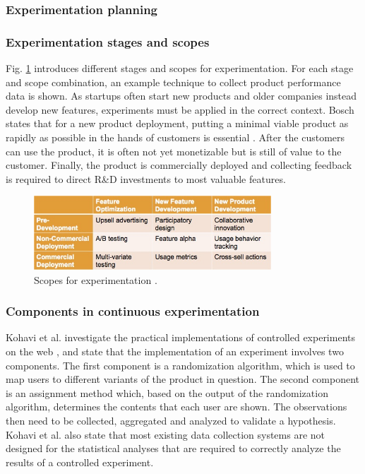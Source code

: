 \documentclass[english]{tktltiki2}
\theoremstyle{definition}
\theoremstyle{remark}
\begin{document}
\subsubsection{Experimentation planning}

\subsubsection{Experimentation stages and scopes}
Fig. \ref{fig4} introduces different stages and scopes for experimentation. For each stage and scope combination, an example technique to collect product performance data is shown. As startups often start new products and older companies instead develop new features, experiments must be applied in the correct context. Bosch states that for a new product deployment, putting a minimal viable product as rapidly as possible in the hands of customers is essential \cite{bosch2012building}. After the customers can use the product, it is often not yet monetizable but is still of value to the customer. Finally, the product is commercially deployed and collecting feedback is required to direct R\&D investments to most valuable features.
\begin{figure}[h]
	\centering
	\includegraphics[width=3.5in]{scopes.jpg}
	\caption{Scopes for experimentation \cite{bosch2012building}.}
	\label{fig4}
\end{figure}

\subsubsection{Components in continuous experimentation}
Kohavi et al. investigate the practical implementations of controlled experiments on the web \cite{kohavi2007practical}, and state that the implementation of an experiment involves two components. The first component is a randomization algorithm, which is used to map users to different variants of the product in question. The second component is an assignment method which, based on the output of the randomization algorithm, determines the contents that each user are shown. The observations then need to be collected, aggregated and analyzed to validate a hypothesis. Kohavi et al. also state that most existing data collection systems are not designed for the statistical analyses that are required to correctly analyze the results of a controlled experiment.
\end{document}
